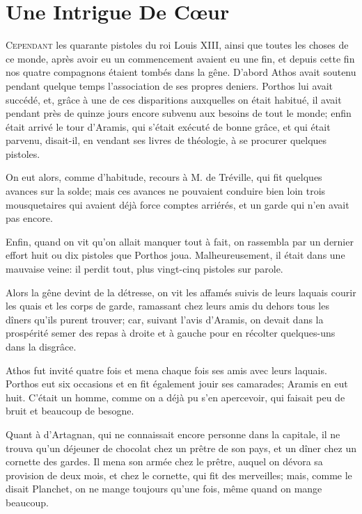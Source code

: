 
\chapter{Une Intrigue De Cœur}

\lettrine{C}{ependant} les quarante pistoles du roi Louis XIII, ainsi que toutes les choses de ce monde, après avoir eu un commencement avaient eu une fin, et depuis cette fin nos quatre compagnons étaient tombés dans la gêne. D'abord Athos avait soutenu pendant quelque temps l'association de ses propres deniers. Porthos lui avait succédé, et, grâce à une de ces disparitions auxquelles on était habitué, il avait pendant près de quinze jours encore subvenu aux besoins de tout le monde; enfin était arrivé le tour d'Aramis, qui s'était exécuté de bonne grâce, et qui était parvenu, disait-il, en vendant ses livres de théologie, à se procurer quelques pistoles. 

On eut alors, comme d'habitude, recours à M. de Tréville, qui fit quelques avances sur la solde; mais ces avances ne pouvaient conduire bien loin trois mousquetaires qui avaient déjà force comptes arriérés, et un garde qui n'en avait pas encore. 

Enfin, quand on vit qu'on allait manquer tout à fait, on rassembla par un dernier effort huit ou dix pistoles que Porthos joua. Malheureusement, il était dans une mauvaise veine: il perdit tout, plus vingt-cinq pistoles sur parole. 

Alors la gêne devint de la détresse, on vit les affamés suivis de leurs laquais courir les quais et les corps de garde, ramassant chez leurs amis du dehors tous les dîners qu'ils purent trouver; car, suivant l'avis d'Aramis, on devait dans la prospérité semer des repas à droite et à gauche pour en récolter quelques-uns dans la disgrâce. 

Athos fut invité quatre fois et mena chaque fois ses amis avec leurs laquais. Porthos eut six occasions et en fit également jouir ses camarades; Aramis en eut huit. C'était un homme, comme on a déjà pu s'en apercevoir, qui faisait peu de bruit et beaucoup de besogne. 

Quant à d'Artagnan, qui ne connaissait encore personne dans la capitale, il ne trouva qu'un déjeuner de chocolat chez un prêtre de son pays, et un dîner chez un cornette des gardes. Il mena son armée chez le prêtre, auquel on dévora sa provision de deux mois, et chez le cornette, qui fit des merveilles; mais, comme le disait Planchet, on ne mange toujours qu'une fois, même quand on mange beaucoup. 

